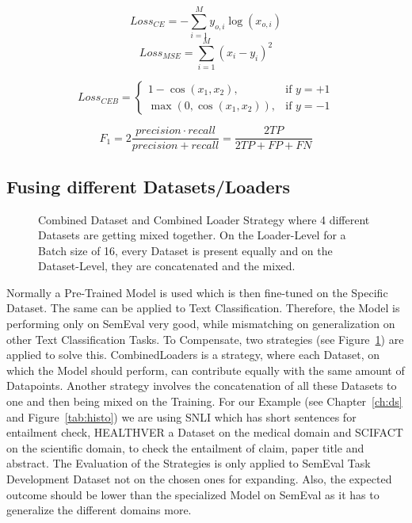 \begin{equation}\label{eq:ce}
   Loss_{CE} = -\sum_{i=1}^My_{o,i}\log(x_{o,i})
\end{equation}
\begin{equation}\label{eq:mse}
   Loss_{MSE} = \sum_{i=1}^{M}(x_i-y_i)^2
\end{equation}

\begin{equation}\label{eq:ceb}
    Loss_{CEB} = \begin{cases}
        1 - \cos(x_1, x_2),      &\text{if $y = +1$}\\
        \max(0, \cos(x_1, x_2)), &\text{if $y = -1$}
    \end{cases}
\end{equation}

\begin{equation}\label{eq:f}
    F_1 = 2 \frac{precision \cdot recall}{precision + recall} = \frac{2 TP}{2TP + FP + FN}
 \end{equation}


 



\subsection{Fusing different Datasets/Loaders}
\begin{figure}[b]
    \centering
    \resizebox{\textwidth}{!}{}
    \caption{Combined Dataset and Combined Loader Strategy where 4 different Datasets are getting mixed together.
             On the Loader-Level for a Batch size of 16, every Dataset is present equally and on the
             Dataset-Level, they are concatenated and the mixed.}\label{fig:test}
\end{figure}


Normally a Pre-Trained Model is used which is then fine-tuned on the Specific Dataset. The same can be applied to
Text Classification. Therefore, the Model is performing only on SemEval very good, while mismatching on generalization
on other Text Classification Tasks. To Compensate, two strategies (see Figure~\ref{fig:test}) are applied to solve this.
CombinedLoaders is a strategy, where each Dataset, on which the Model should perform, can contribute equally with
the same amount of Datapoints. Another strategy involves the concatenation of all these Datasets to one and then being
mixed on the Training. For our Example (see Chapter~\ref{ch:ds} and Figure~\ref{tab:histo}) we are using SNLI \cite{noauthor_snli_2023}
which has short sentences for entailment check, HEALTHVER \cite{noauthor_dwaddenhealthver_entailment_nodate} a Dataset on the medical domain and
SCIFACT \cite{noauthor_allenaiscifact_entailment_nodate} on the scientific domain, to check the entailment of claim, 
paper title and abstract. The Evaluation of the Strategies is only applied to SemEval Task Development
Dataset not on the chosen ones for expanding. Also, the expected outcome should be lower than the
specialized Model on SemEval as it has to generalize the different domains more.


